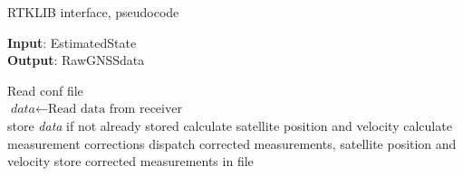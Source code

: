     \begin{algorithm}
    \caption{RTKLIB interface, pseudocode}\label{alg:rtklib-interface}
    \begin{flushleft}
    \textbf{Input}:  EstimatedState\\
    \textbf{Output}: RawGNSSdata
    \end{flushleft}
    \vspace{-0.3cm}
    \hrulefill
    \vspace{0.3cm}
    \begin{algorithmic}
    \State Read conf file\\
    \State $\textit{data} \gets \text{Read data from receiver}$\\
        \STATE store \textit{data} if not already stored
        \STATE calculate satellite position and velocity
        \STATE calculate measurement corrections
        \STATE dispatch corrected measurements, satellite position and velocity
        \STATE store corrected measurements in file
    \ENDIF
    \end{algorithmic}
    \end{algorithm}
